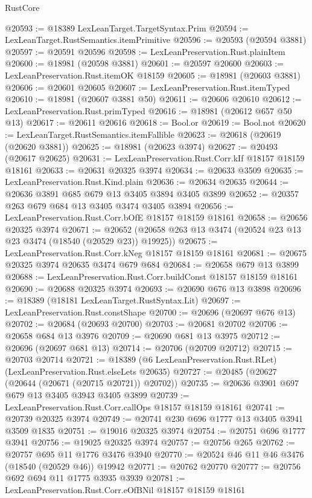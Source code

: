 \begin{lexlean}{RustCore}
\begin{coremodule}
@20593 := @18389 LexLeanTarget.TargetSyntax.Prim
@20594 := LexLeanTarget.RustSemantics.itemPrimitive
@20596 := @20593 (@20594 @3881)
@20597 := @20591 @20596
@20598 := LexLeanPreservation.Rust.plainItem
@20600 := @18981 (@20598 @3881)
@20601 := @20597 @20600
@20603 := LexLeanPreservation.Rust.itemOK @18159
@20605 := @18981 (@20603 @3881)
@20606 := @20601 @20605
@20607 := LexLeanPreservation.Rust.itemTyped
@20610 := @18981 (@20607 @3881 @50)
@20611 := @20606 @20610
@20612 := LexLeanPreservation.Rust.primTyped
@20616 := @18981 (@20612 @657 @50 @13)
@20617 := @20611 @20616
@20618 := Bool.or
@20619 := Bool.not
@20620 := LexLeanTarget.RustSemantics.itemFallible
@20623 := @20618 (@20619 (@20620 @3881))
@20625 := @18981 (@20623 @3974)
@20627 := @20493 (@20617 @20625)
@20631 := LexLeanPreservation.Rust.Corr.kIf @18157 @18159 @18161
@20633 := @20631 @20325 @3974
@20634 := @20633 @3509
@20635 := LexLeanPreservation.Rust.Kind.plain
@20636 := @20634 @20635
@20644 := @20636 @3891 @685 @679 @13 @3405 @3894 @3405 @3899
@20652 := @20357 @263 @679 @684 @13 @3405 @3474 @3405 @3894
@20656 := LexLeanPreservation.Rust.Corr.bOfE @18157 @18159 @18161
@20658 := @20656 @20325 @3974
@20671 := @20652 (@20658 @263 @13 @3474 (@20524 @23 @13 @23 @3474 (@18540 (@20529 @23)) @19925))
@20675 := LexLeanPreservation.Rust.Corr.kNeg @18157 @18159 @18161
@20681 := @20675 @20325 @3974 @20635 @3474 @679 @684
@20684 := @20658 @679 @13 @3899
@20688 := LexLeanPreservation.Rust.Corr.buildConst @18157 @18159 @18161
@20690 := @20688 @20325 @3974
@20693 := @20690 @676 @13 @3898
@20696 := @18389 (@18181 LexLeanTarget.RustSyntax.Lit)
@20697 := LexLeanPreservation.Rust.constShape
@20700 := @20696 (@20697 @676 @13)
@20702 := @20684 (@20693 @20700)
@20703 := @20681 @20702
@20706 := @20658 @684 @13 @3976
@20709 := @20690 @681 @13 @3975
@20712 := @20696 (@20697 @681 @13)
@20714 := @20706 (@20709 @20712)
@20715 := @20703 @20714
@20721 := @18389 (@6 LexLeanPreservation.Rust.RLet) (LexLeanPreservation.Rust.elseLets @20635)
@20727 := @20485 (@20627 (@20644 (@20671 (@20715 @20721)) @20702))
@20735 := @20636 @3901 @697 @679 @13 @3405 @3943 @3405 @3899
@20739 := LexLeanPreservation.Rust.Corr.callOps @18157 @18159 @18161
@20741 := @20739 @20325 @3974
@20749 := @20741 @230 @696 @1777 @13 @3405 @3941 @3509 @1835
@20751 := @19016 @20325 @3974
@20754 := @20751 @696 @1777 @3941
@20756 := @19025 @20325 @3974
@20757 := @20756 @265
@20762 := @20757 @695 @11 @1776 @3476 @3940
@20770 := @20524 @46 @11 @46 @3476 (@18540 (@20529 @46)) @19942
@20771 := @20762 @20770
@20777 := @20756 @692 @694 @11 @1775 @3935 @3939
@20781 := LexLeanPreservation.Rust.Corr.eOfBNil @18157 @18159 @18161

\end{coremodule}
\end{lexlean}
